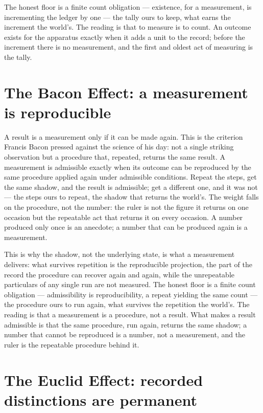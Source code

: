 The honest floor is a finite count obligation --- existence, for a measurement, is incrementing the ledger by
one --- the tally ours to keep, what earns the increment the world's. The reading is that to measure is to
count. An outcome exists for the apparatus exactly when it adds a
unit to the record; before the increment there is no measurement, and the first and oldest act of measuring is
the tally.

\section{The Bacon Effect: a measurement is reproducible}
\label{se:bacon}

A result is a measurement only if it can be made again. This is the criterion Francis Bacon pressed against
the science of his day: not a single striking observation but a procedure that, repeated, returns the same
result. A measurement is admissible exactly when its outcome can be reproduced by the same procedure applied
again under admissible conditions. Repeat the steps, get the same shadow, and the result is admissible;
get a different one, and it was not --- the steps ours to repeat, the shadow that returns the world's. The weight falls on the procedure, not the number: the ruler is not the
figure it returns on one occasion but the repeatable act that returns it on every occasion. A number produced
only once is an anecdote; a number that can be produced again is a measurement.

This is why the shadow, not the underlying state, is what a measurement delivers: what survives repetition is
the reproducible projection, the part of the record the procedure can recover again and again, while the
unrepeatable particulars of any single run are not measured. The honest floor is a finite count obligation ---
admissibility is reproducibility, a repeat yielding the same count --- the procedure ours to run again, what
survives the repetition the world's. The reading is that a measurement is a
procedure, not a result. What makes a result admissible is that the same procedure, run again, returns the
same shadow; a number that cannot be reproduced is a number, not a measurement, and the ruler is the
repeatable procedure behind it.

\section{The Euclid Effect: recorded distinctions are permanent}
\label{se:euclid}

